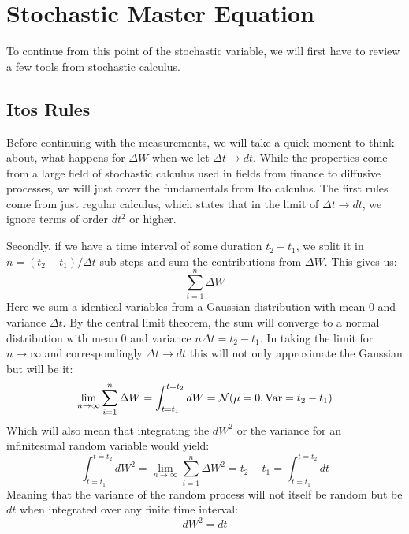
\section{Stochastic Master Equation}
To continue from this point of the stochastic variable, we will first have to review a few tools from stochastic calculus.

\subsection{Itos Rules}
Before continuing with the measurements, we will take a quick moment to think about, what happens for $\Delta W$ when we let $\Delta t \to dt$. While the properties come from a large field of stochastic calculus used in fields from finance to diffusive processes, we will just cover the fundamentals from Ito calculus.  The first rules come from just regular calculus, which states that in the limit of $\Delta t \to dt$, we ignore terms of order $dt^2$ or higher. 

Secondly, if we have a time interval of some duration $t_2 - t_1$, we split it in $n = (t_2 - t_1)/\Delta t$ sub steps and sum the contributions from $\Delta W$. This gives us:
\begin{equation}
    \sum_{i=1}^n \Delta W
\end{equation}
Here we sum a identical variables from a Gaussian distribution with mean $0$ and variance $\Delta t$. By the central limit theorem, the sum will converge to a normal distribution with mean $0$ and variance $n \Delta{t} = t_2 - t_1$. In taking the limit for $n \to \infty$ and correspondingly $\Delta t \to dt$ this will not only approximate the Gaussian but will be it:
\begin{equation}
    \lim_{n \to \infty} \sum_{i=1}^n \Delta W = \int_{t = t_1}^{t = t_2} dW = \mathcal{N}(\mu = 0, \operatorname{Var} = t_2 - t_1)
\end{equation}
Which will also mean that integrating the $dW^2$ or the variance for an infinitesimal random variable would yield:
\begin{equation}
    \int_{t = t_1}^{t = t_2} dW^2 =  \lim_{n \to \infty} \sum_{i=1}^n \Delta W^2 = t_2 - t_1 = \int_{t = t_1}^{t = t_2} dt
\end{equation}
Meaning that the variance of the random process will not itself be random but be $dt$ when integrated over any finite time interval: 
\begin{equation}
    dW^2 = dt
\end{equation}

